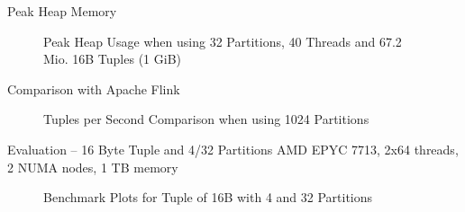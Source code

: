 \begin{frame}{Peak Heap Memory}
  \begin{figure}[h]
    \centering
    \resizebox{.85\linewidth}{!}{}
    \caption[Peak Heap Memory Benchmark Plot]{Peak Heap Usage when using 32 Partitions, 40 Threads and 67.2 Mio.
      16B Tuples (1 GiB)} \label{plot-heap-16B-P32-Th40}
  \end{figure}
\end{frame}

\begin{frame}{Comparison with Apache Flink}
  \begin{figure}[h]
    \centering
    \resizebox{.7\linewidth}{!}{}
    \caption[Tuples per Second Comparison Plot with Apache Flink]{Tuples per Second Comparison when using 1024 Partitions}
    \label{plot-apache-flink-comparison}
  \end{figure}
\end{frame}

\begin{frame}{Evaluation -- \LARGE 16 Byte Tuple and 4/32 Partitions}
  AMD EPYC 7713, 2x64 threads, 2 NUMA nodes,  1 TB memory
  \begin{figure}[h]
    \centering
    \begin{subfigure}{.49\textwidth}
      \centering
      \resizebox{\linewidth}{!}{}
    \end{subfigure}
    \begin{subfigure}{.49\textwidth}
      \centering
      \resizebox{\linewidth}{!}{}
    \end{subfigure}
    \begin{subfigure}{\textwidth}
      \centering
      \resizebox{.85\linewidth}{!}{}
    \end{subfigure}
    \caption[Shuffle Benchmark Plots for Tuple of 16B with 4 and 32 Partitions]{Benchmark Plots for Tuple of 16B with 4 and 32 Partitions}
    \label{plot-epyc-shuffle-16B-32-1024}
  \end{figure}
\end{frame}

